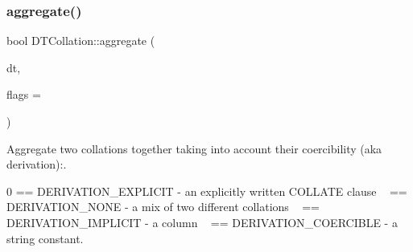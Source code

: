 \subsubsection{\texorpdfstring{aggregate()}{aggregate()}}
{\footnotesize\ttfamily bool D\+T\+Collation\+::aggregate (\begin{DoxyParamCaption}\item[{\mbox{\hyperlink{classDTCollation}{D\+T\+Collation}} \&}]{dt,  }\item[{uint}]{flags = {} }\end{DoxyParamCaption})}

Aggregate two collations together taking into account their coercibility (aka derivation)\+:.

0 == D\+E\+R\+I\+V\+A\+T\+I\+O\+N\+\_\+\+E\+X\+P\+L\+I\+C\+IT -\/ an explicitly written C\+O\+L\+L\+A\+TE clause ~ == D\+E\+R\+I\+V\+A\+T\+I\+O\+N\+\_\+\+N\+O\+NE -\/ a mix of two different collations ~ == D\+E\+R\+I\+V\+A\+T\+I\+O\+N\+\_\+\+I\+M\+P\+L\+I\+C\+IT -\/ a column ~ == D\+E\+R\+I\+V\+A\+T\+I\+O\+N\+\_\+\+C\+O\+E\+R\+C\+I\+B\+LE -\/ a string constant.

